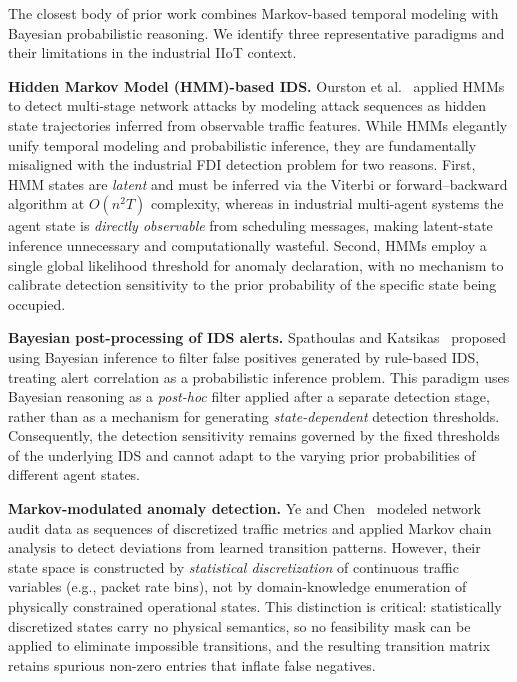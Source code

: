\documentclass[manuscript,screen,review]{acmart}
\begin{document}
The closest body of prior work combines Markov-based temporal
modeling with Bayesian probabilistic reasoning. We identify
three representative paradigms and their limitations in the
industrial IIoT context.

\textbf{Hidden Markov Model (HMM)-based IDS.}
Ourston et al.~\cite{ref_ourston} applied HMMs to detect
multi-stage network attacks by modeling attack sequences as
hidden state trajectories inferred from observable traffic
features. While HMMs elegantly unify temporal modeling and
probabilistic inference, they are fundamentally misaligned
with the industrial FDI detection problem for two reasons.
First, HMM states are \emph{latent} and must be inferred via
the Viterbi or forward--backward algorithm at $O(n^2 T)$
complexity, whereas in industrial multi-agent systems the
agent state is \emph{directly observable} from scheduling
messages, making latent-state inference unnecessary and
computationally wasteful. Second, HMMs employ a single global
likelihood threshold for anomaly declaration, with no
mechanism to calibrate detection sensitivity to the prior
probability of the specific state being occupied.

\textbf{Bayesian post-processing of IDS alerts.}
Spathoulas and Katsikas~\cite{ref_spathoulas} proposed using
Bayesian inference to filter false positives generated by
rule-based IDS, treating alert correlation as a probabilistic
inference problem. This paradigm uses Bayesian reasoning as a
\emph{post-hoc} filter applied after a separate detection
stage, rather than as a mechanism for generating
\emph{state-dependent} detection thresholds. Consequently,
the detection sensitivity remains governed by the fixed
thresholds of the underlying IDS and cannot adapt to the
varying prior probabilities of different agent states.

\textbf{Markov-modulated anomaly detection.}
Ye and Chen~\cite{ref_ye} modeled network audit data as
sequences of discretized traffic metrics and applied Markov
chain analysis to detect deviations from learned transition
patterns. However, their state space is constructed by
\emph{statistical discretization} of continuous traffic
variables (e.g., packet rate bins), not by domain-knowledge
enumeration of physically constrained operational states.
This distinction is critical: statistically discretized
states carry no physical semantics, so no feasibility mask
can be applied to eliminate impossible transitions, and the
resulting transition matrix retains spurious non-zero entries
that inflate false negatives.
\end{document}
